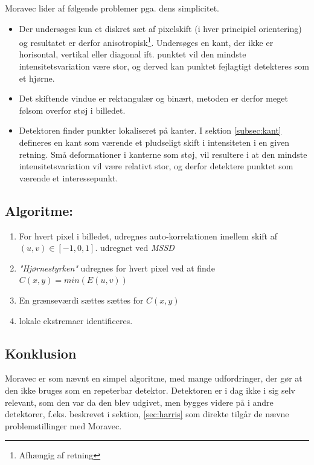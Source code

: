 Moravec lider af følgende problemer pga. dens simplicitet. 
\begin{itemize}
\item{ Der undersøges kun et diskret sæt af pixelskift (i hver principiel orientering) og resultatet er derfor anisotropisk\footnote{Afhængig af retning}. Undersøges en kant, der ikke er horisontal, vertikal eller diagonal ift. punktet vil den mindste intensitetsvariation være stor, og derved kan punktet fejlagtigt detekteres som et hjørne.}
\item{Det skiftende vindue er rektangulær og binært, metoden er derfor meget følsom overfor støj i billedet.}
\item{Detektoren finder punkter lokaliseret på kanter. I sektion \ref{subsec:kant} defineres en kant som værende et pludseligt skift i intensiteten i en given retning. Små deformationer i kanterne som støj, vil resultere i at den mindste intensitetsvariation vil være relativt stor, og derfor detektere punktet som værende et interessepunkt.}
\end{itemize}
\subsection*{Algoritme:}
\begin{enumerate}
\item{For hvert pixel i billedet, udregnes auto-korrelationen imellem skift af $(u,v) \in [-1,0,1]$. udregnet ved \textit{MSSD} }
\item{\textit{"Hjørnestyrken"} udregnes for hvert pixel ved at finde $C(x,y)=min(E(u,v))$ }
\item{ En grænseværdi sættes sættes for $C(x,y)$}
\item{lokale ekstremaer identificeres. }
\end{enumerate}
\subsection*{Konklusion}
Moravec er som nævnt en simpel algoritme, med mange udfordringer, der gør at den ikke bruges som en repeterbar detektor. Detektoren er i dag ikke i sig selv relevant, som den var da den blev udgivet, men bygges videre på i andre detektorer, f.eks. \cite{Harris} beskrevet i sektion, \ref{sec:harris} som direkte tilgår de nævne problemstillinger med Moravec.